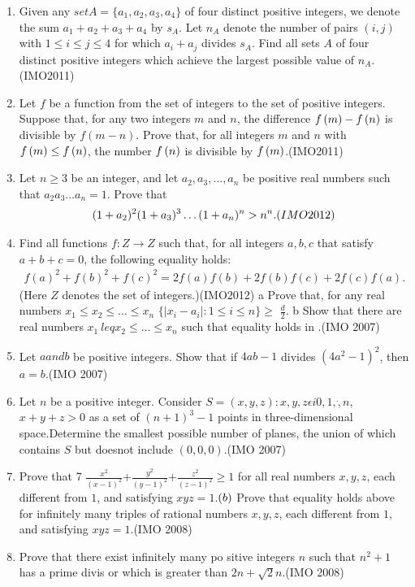 \begin{enumerate}
			\item Given any $setA=\{a_{1}, a_{2}, a_{3}, a_{4}\}$ of four distinct positive integers, we denote the sum $a_{1}+a_{2}+a_{3}+a_{4}$ by $s_{A}$. Let $n_{A}$ denote the number of pairs $ ( i, j) $ with $1\leq{i}\leq{j}\leq{4}$ for which $a_{i}+a_{j}$ divides $s_{A}$. Find all sets $A$ of four distinct positive integers which achieve the largest possible value of $n_{A}$.\hfill(IMO2011)
			\item  Let $f$ be a function from the set of integers to the set of positive integers. Suppose that, for any two integers $m$ and $n$, the difference $f\left(m\right) -f\left(n\right)$ is divisible by $f( m-n)$. Prove that, for all integers $m$ and $n$ with $f \left(m\right) \leq{f\ensuremath{\left(n\right)}}$, the number $f\left(n\right)$ is divisible by $f\left(m\right)$.\hfill(IMO2011)
			\item  Let $n\geq{3}$ be an integer, and let $a_{2}, a_{3},\dots, a_{n}$  be positive real numbers such that $a_{2}a_{3} \dots a_{n}=1$. Prove that
				\begin{align}
					(1+a_{2}) ^{2}  (1+a_{3}) ^{3} \dots (1+a_{n}) ^{n} > n^{n}.\hfill(IMO2012)
				\end{align}
			\item Find all functions $f:Z \rightarrow Z $ such that, for all integers $a, b, c$ that satisfy $a+b+c = 0$, the following equality holds:
				\begin{align}
					f(a)^2+f(b)^2+f(c)^2=2f(a)f(b)+2f(b)f(c)+2f(c)f(a).
				\end{align}
				(Here $Z$ denotes the set of integers.)\hfill(IMO2012)
				\brak a Prove that, for any real numbers $x_{1} \leq x_{2} \leq \dots \leq x_{n}$ 
	 $\{ | x_{i} - a_{i} | : 1 \leq  i \leq n \} \geq$  $\frac {d}{2}$. \brak *                                \brak b Show that there are real numbers $x_{1} \ leq x_{2} \leq \dots \leq x_{n}$ such that equality holds in \brak *.\hfill(IMO 2007)
\item Let $a and b$ be positive integers. Show that if     $4ab-1$ divides $(4a^2-1)^2$, then $a=b$.\hfill(IMO 2007)
\item Let $n$ be a positive integer. Consider           $S={(x,y,z)} : {x,y,z} \epsilon i{0,1,\dot,n}$,     ${x+y+z>0}$  as a set of $(n+1)^{3}-1$ points in three-dimensional space.Determine the smallest possible number of planes, the union of which contains $S$ but doesnot include $(0,0,0)$.\hfill(IMO 2007) 
	\item Prove that                                         7 $\frac{x^2}{{(x-1)}^{2}}$+$\frac{y^2}{{(y-1)}^{2}}$+$\frac{z^2}{{(z-1)}^{2}} \geq 1$
	for all real numbers $x, y, z$, each different from $1$, and satisfying $xyz = 1$.$\left(b\right)$  Prove that equality holds above for infinitely many triples of rational numbers $x, y, z$, each different from  $1$, and satisfying $xyz=1$.\hfill(IMO 2008)
\item Prove that there exist infinitely many po    sitive integers $n$ such that $n^2+1$ has a prime divis    or which is greater than $2n+\sqrt2n$.\hfill(IMO 2008)


\end{enumerate}
